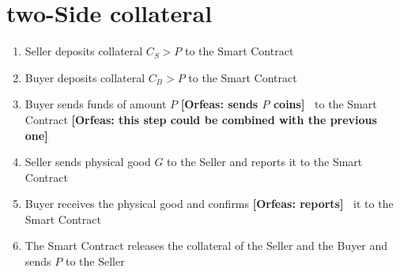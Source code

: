 \documentclass{cacthesis}
\newcommand{\authnote}[3]{{ \footnotesize \textbf{#1[#2: #3]~}}}
\newcommand{\orfnote}[1]{\authnote{\color{blue}}{Orfeas}{#1}}
\begin{document}
\section{two-Side collateral}
\begin{enumerate}
    \item Seller deposits collateral $C_S > P$ to the Smart Contract
    \item Buyer deposits collateral $C_B > P$ to the Smart Contract
    \item Buyer sends funds of amount $P$ \orfnote{sends $P$ coins} to the Smart
    Contract \orfnote{this step could be combined with the previous one}
    \item Seller sends physical good $G$ to the Seller and reports it to the Smart Contract
    \item Buyer receives the physical good and confirms \orfnote{reports} it to the Smart Contract
    \item The Smart Contract releases the collateral of the Seller and the Buyer and sends $P$ to the Seller
\end{enumerate}
\end{document}
